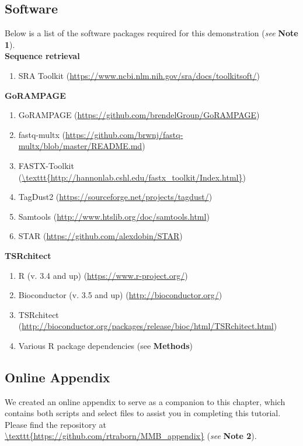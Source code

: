 \documentclass[runningheads,a4paper]{llncs}
\begin{document}
\begin{linenumbers}
\subsection{Software}
Below is a list of the software packages required for this demonstration (\textit{see} \textbf{Note 1}).\\
\textbf{Sequence retrieval}
\begin{enumerate}
\item SRA Toolkit \cite{Leinonen:2011iw}  (\url{https://www.ncbi.nlm.nih.gov/sra/docs/toolkitsoft/})
\end{enumerate}
\textbf{GoRAMPAGE}
\begin{enumerate}
\item GoRAMPAGE \cite{Brendel:2016ab} (\url{https://github.com/brendelGroup/GoRAMPAGE})
\item fastq-multx \cite{Aronesty:2013gt} (\url{https://github.com/brwnj/fastq-multx/blob/master/README.md})
\item FASTX-Toolkit \cite{citeulike:9103573} (\url{\texttt{http://hannonlab.cshl.edu/fastx\_toolkit/Index.html}})
\item TagDust2 \cite{Lassmann:2015gs} (\url{https://sourceforge.net/projects/tagdust/})
\item Samtools \cite{Li:2009ka} (\url{http://www.htslib.org/doc/samtools.html})
\item STAR \cite{Dobin:2016kq} (\url{https://github.com/alexdobin/STAR})
\end{enumerate}
\textbf{TSRchitect}
\begin{enumerate}
\item R (v. 3.4 and up) \cite{RCore:2017ab} (\url{https://www.r-project.org/})
\item Bioconductor (v. 3.5 and up) \cite{Lawrence:2014gy} (\url{http://bioconductor.org/})
\item TSRchitect \cite{Raborn:2017ab} (\url{http://bioconductor.org/packages/release/bioc/html/TSRchitect.html})
\item Various R package dependencies (see \textbf{Methods})
\end{enumerate}

\subsection{Online Appendix}
We created an online appendix to serve as a companion to this chapter, which contains both scripts and select files to assist you in completing this tutorial.
Please find the repository at \url{\texttt{https://github.com/rtraborn/MMB\_appendix}} (\textit{see} \textbf{Note 2}).


\end{linenumbers}
\end{document}
